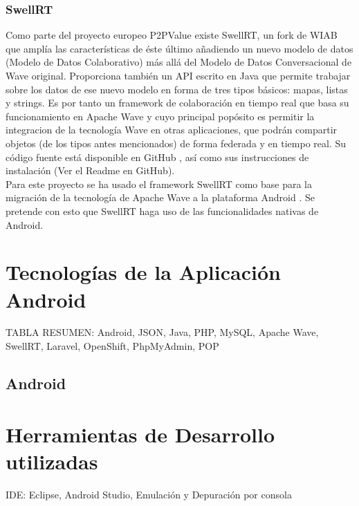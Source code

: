     \subsubsection{SwellRT}\label{sssec:swellRT}
    
    Como parte del proyecto europeo P2PValue \cite{ref:p2pvalue} existe SwellRT, un fork de WIAB que amplía las características de éste último añadiendo un nuevo modelo de datos (Modelo de Datos Colaborativo) más allá del Modelo de Datos Conversacional de Wave original. Proporciona también un API escrito en Java que permite trabajar sobre los datos de ese nuevo modelo en forma de tres tipos básicos: mapas, listas y strings. Es por tanto un framework de colaboración en tiempo real que basa su funcionamiento en Apache Wave y cuyo principal popósito es permitir la integracion de la tecnología Wave en otras aplicaciones, que podrán compartir objetos (de los tipos antes mencionados) de forma federada y en tiempo real. Su código fuente está disponible en GitHub \cite{ref:swellRT_github}, así como sus instrucciones de instalación (Ver el Readme en GitHub).\\[.2cm]

    Para este proyecto se ha usado el framework SwellRT como base para la migración de la tecnología de Apache Wave a la plataforma Android \cite{ref:android_platform}. Se pretende con esto que SwellRT haga uso de las funcionalidades nativas de Android.
       

\section{Tecnologías de la Aplicación Android}
  
  TABLA RESUMEN: Android, JSON, Java, PHP, MySQL, Apache Wave, SwellRT, Laravel, OpenShift, PhpMyAdmin, POP 
    
    \subsection{Android}
  
\section{Herramientas de Desarrollo utilizadas}

  IDE: Eclipse, Android Studio, Emulación y Depuración por consola 

